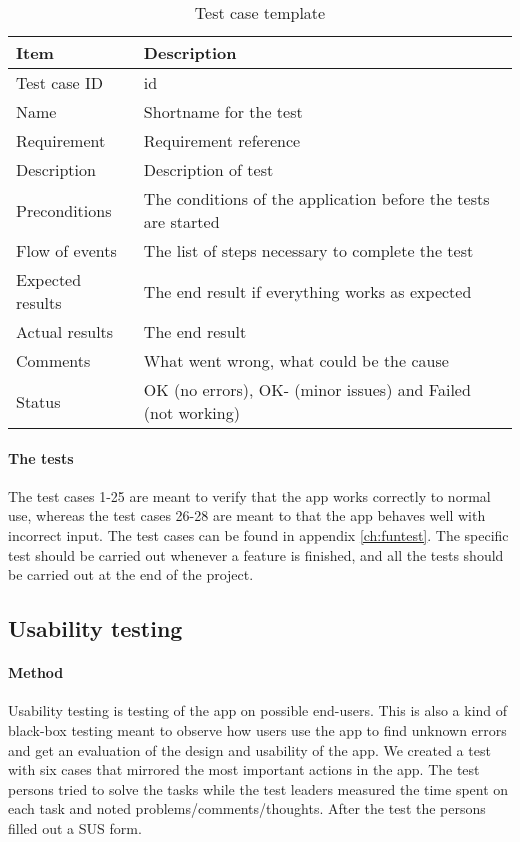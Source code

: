 \begin{table}[h!]
\begin{center}
\begin{tabular}{l|p{10cm}}\hline
\textbf{Item} & \textbf{Description} \\ \hline \hline
Test case ID & id \\ \hline
Name & Shortname for the test\\ \hline
Requirement & Requirement reference\\ \hline
Description & Description of test\\ \hline
Preconditions & The conditions of the application before the tests are started\\ \hline
Flow of events & The list of steps necessary to complete the test \\ \hline
Expected results & The end result if everything works as expected\\ \hline 
Actual results & The end result\\ \hline
Comments & What went wrong, what could be the cause\\ \hline
Status &OK (no errors), OK- (minor issues) and Failed (not working)\\ \hline
\end{tabular}
\end{center}
\caption{Test case template} \label{tab:casetemp1}
\end{table}
\paragraph{The tests}\hfill
\newline

The test cases 1-25 are meant to verify that the app works correctly to normal use, whereas the test cases 26-28 are meant to that the app behaves well with incorrect input. The test cases can be found in appendix \ref{ch:funtest}. The specific test should be carried out whenever a feature is finished, and all the tests should be carried out at the end of the project.
			
\subsection{Usability testing}\label{subsec:usabilitytesting}
\paragraph{Method}\hfill
\newline
Usability testing is testing of the app on possible end-users. This is also a kind of black-box testing meant to observe how users use the app to find unknown errors and get an evaluation of the design and usability of the app. We created a test with six cases that mirrored the most important actions in the app. The test persons tried to solve the tasks while the test leaders measured the time spent on each task and noted problems/comments/thoughts. After the test the persons filled out a SUS form.

